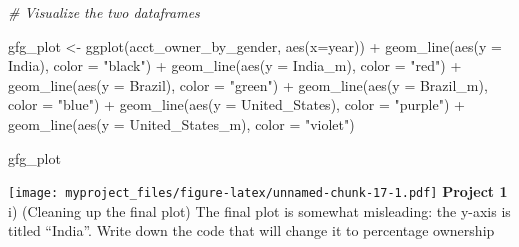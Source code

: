 \documentclass[
]{article}
\newenvironment{Shaded}{\begin{snugshade}}{\end{snugshade}}
\newcommand{\AttributeTok}[1]{\textcolor[rgb]{0.77,0.63,0.00}{#1}}
\newcommand{\CommentTok}[1]{\textcolor[rgb]{0.56,0.35,0.01}{\textit{#1}}}
\newcommand{\FunctionTok}[1]{\textcolor[rgb]{0.00,0.00,0.00}{#1}}
\newcommand{\NormalTok}[1]{#1}
\newcommand{\OtherTok}[1]{\textcolor[rgb]{0.56,0.35,0.01}{#1}}
\newcommand{\SpecialCharTok}[1]{\textcolor[rgb]{0.00,0.00,0.00}{#1}}
\newcommand{\StringTok}[1]{\textcolor[rgb]{0.31,0.60,0.02}{#1}}
\begin{document}
\begin{Shaded}
\begin{Highlighting}[]
\CommentTok{\# Visualize the two dataframes}

\NormalTok{gfg\_plot }\OtherTok{\textless{}{-}} \FunctionTok{ggplot}\NormalTok{(acct\_owner\_by\_gender, }\FunctionTok{aes}\NormalTok{(}\AttributeTok{x=}\NormalTok{year)) }\SpecialCharTok{+}
\FunctionTok{geom\_line}\NormalTok{(}\FunctionTok{aes}\NormalTok{(}\AttributeTok{y =}\NormalTok{ India), }\AttributeTok{color =} \StringTok{"black"}\NormalTok{) }\SpecialCharTok{+}
\FunctionTok{geom\_line}\NormalTok{(}\FunctionTok{aes}\NormalTok{(}\AttributeTok{y =}\NormalTok{ India\_m), }\AttributeTok{color =} \StringTok{"red"}\NormalTok{) }\SpecialCharTok{+}
\FunctionTok{geom\_line}\NormalTok{(}\FunctionTok{aes}\NormalTok{(}\AttributeTok{y =}\NormalTok{ Brazil), }\AttributeTok{color =} \StringTok{"green"}\NormalTok{) }\SpecialCharTok{+}
\FunctionTok{geom\_line}\NormalTok{(}\FunctionTok{aes}\NormalTok{(}\AttributeTok{y =}\NormalTok{ Brazil\_m), }\AttributeTok{color =} \StringTok{"blue"}\NormalTok{) }\SpecialCharTok{+}
\FunctionTok{geom\_line}\NormalTok{(}\FunctionTok{aes}\NormalTok{(}\AttributeTok{y =}\NormalTok{ United\_States), }\AttributeTok{color =} \StringTok{"purple"}\NormalTok{) }\SpecialCharTok{+}
\FunctionTok{geom\_line}\NormalTok{(}\FunctionTok{aes}\NormalTok{(}\AttributeTok{y =}\NormalTok{ United\_States\_m), }\AttributeTok{color =} \StringTok{"violet"}\NormalTok{)}

\NormalTok{gfg\_plot}
\end{Highlighting}
\end{Shaded}

\texttt{[image: myproject\_files/figure-latex/unnamed-chunk-17-1.pdf]}
\textbf{Project 1} i) (Cleaning up the final plot) The final plot is
somewhat misleading: the y-axis is titled ``India''. Write down the code
that will change it to percentage ownership
\end{document}
